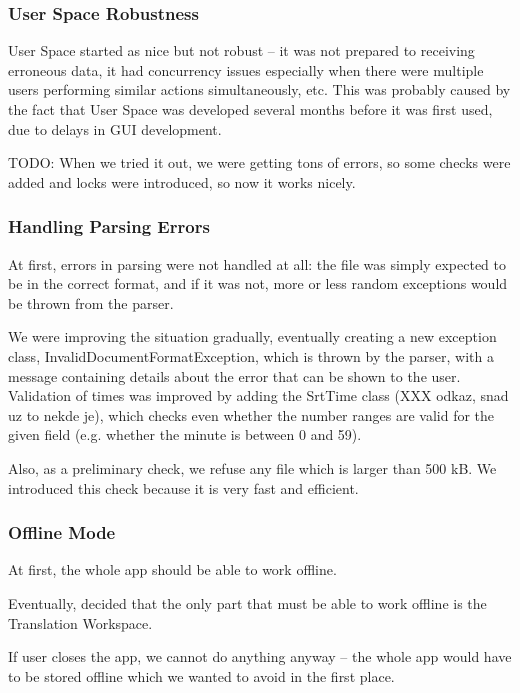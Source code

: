 \subsubsection{User Space Robustness}

User Space started as nice but not robust -- it was not prepared to receiving erroneous data, it had concurrency issues especially when there were multiple users performing similar actions simultaneously, etc. This was probably caused by the fact that User Space was developed several months before it was first used, due to delays in GUI development.

TODO: When we tried it out, we were getting tons of errors, so some checks were added and locks were introduced, so now it works nicely.

\subsubsection{Handling Parsing Errors}

At first, errors in parsing were not handled at all: the file was simply expected to be in the correct format, and if it was not, more or less random exceptions would be thrown from the parser.

We were improving the situation gradually, eventually creating a new exception class, InvalidDocumentFormatException, which is thrown by the parser, with a message containing details about the error that can be shown to the user.
Validation of times was improved by adding the SrtTime class (XXX odkaz, snad uz to nekde je), which checks even whether the number ranges are valid for the given field (e.g. whether the minute is between 0 and 59).

Also, as a preliminary check, we refuse any file which is larger than 500 kB. We introduced this check because it is very fast and efficient.

\subsubsection{Offline Mode}

At first, the whole app should be able to work offline.

Eventually, decided that the only part that must be able to work offline is the Translation Workspace.

If user closes the app, we cannot do anything anyway -- the whole app would have to be stored offline which we wanted to avoid in the first place.

